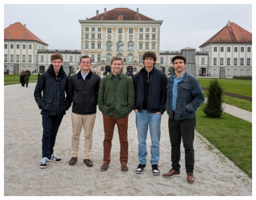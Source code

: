 %
\newpage
\begin{center}
		\begin{figurehere}
		\includegraphics[width=.7\linewidth]{./Bilder/Neue Bilder/Aktivenfahrt/Aktivenfahrt}
		\end{figurehere}
\end{center}
	
